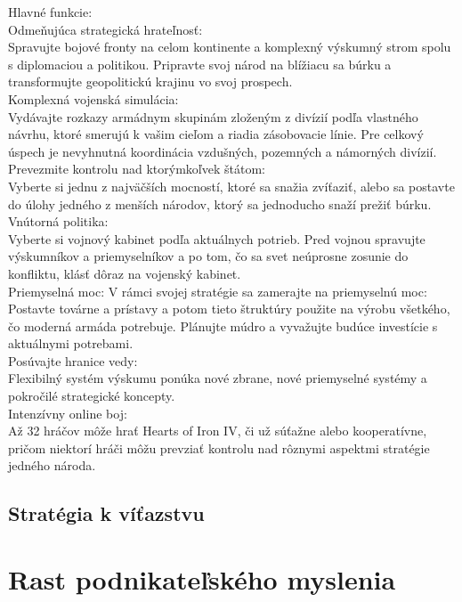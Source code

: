 \documentclass[10pt,oneside,slovak,a4paper]{article}
\begin{document}
Hlavné funkcie:\\
Odmeňujúca strategická hrateľnosť:\\
Spravujte bojové fronty na celom kontinente a komplexný výskumný strom spolu s diplomaciou a politikou. Pripravte svoj národ na blížiacu sa búrku a transformujte geopolitickú krajinu vo svoj prospech.\\
Komplexná vojenská simulácia:\\
Vydávajte rozkazy armádnym skupinám zloženým z divízií podľa vlastného návrhu, ktoré smerujú k vašim cieľom a riadia zásobovacie línie. Pre celkový úspech je nevyhnutná koordinácia vzdušných, pozemných a námorných divízií.
Prevezmite kontrolu nad ktorýmkoľvek štátom:\\
Vyberte si jednu z najväčších mocností, ktoré sa snažia zvíťaziť, alebo sa postavte do úlohy jedného z menších národov, ktorý sa jednoducho snaží prežiť búrku.\\
Vnútorná politika:\\
Vyberte si vojnový kabinet podľa aktuálnych potrieb. Pred vojnou spravujte výskumníkov a priemyselníkov a po tom, čo sa svet neúprosne zosunie do konfliktu, klásť dôraz na vojenský kabinet.\\
Priemyselná moc: V rámci svojej stratégie sa zamerajte na priemyselnú moc:\\
Postavte továrne a prístavy a potom tieto štruktúry použite na výrobu všetkého, čo moderná armáda potrebuje. Plánujte múdro a vyvažujte budúce investície s aktuálnymi potrebami.\\
Posúvajte hranice vedy:\\
Flexibilný systém výskumu ponúka nové zbrane, nové priemyselné systémy a pokročilé strategické koncepty.\\
Intenzívny online boj:\\
Až 32 hráčov môže hrať Hearts of Iron IV, či už súťažne alebo kooperatívne, pričom niektorí hráči môžu prevziať kontrolu nad rôznymi aspektmi stratégie jedného národa.\\

\subsection{Stratégia k víťazstvu}
\section{Rast podnikateľského myslenia}
\end{document}
